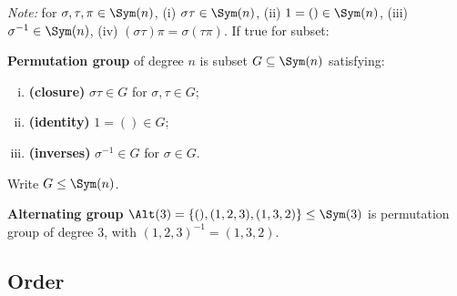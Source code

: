 \begin{slide}
    \textit{Note:} for $\sigma,\tau,\pi \in \Sym(n)$, (i) $\sigma\tau \in \Sym(n)$, (ii) $1 = () \in \Sym(n)$, (iii) $\sigma^{-1} \in \Sym(n)$, (iv) $(\sigma\tau)\pi = \sigma(\tau\pi)$. If true for subset:

    \begin{definition}
        \vspace{0pt}
        \textbf{Permutation group} of degree $n$ is subset $G \subseteq \Sym(n)$ satisfying:
        \begin{enumerate}[(i)]
            \item \textbf{(closure)} $\sigma\tau \in G$ for $\sigma,\tau \in G$; \pause
            \item \textbf{(identity)} $1 = () \in G$; \pause
            \item \textbf{(inverses)} $\sigma^{-1} \in G$ for $\sigma \in G$.
        \end{enumerate}
        Write $G \leq \Sym(n)$.
    \end{definition}

    \begin{example}
        \vspace{0pt}
        \textbf{Alternating group} $\Alt(3) = \{(),(1,2,3),(1,3,2)\} \leq \Sym(3)$ is permutation group of degree 3, with $(1,2,3)^{-1} = (1,3,2)$.
    \end{example}
\end{slide}

\subsection{Order}

